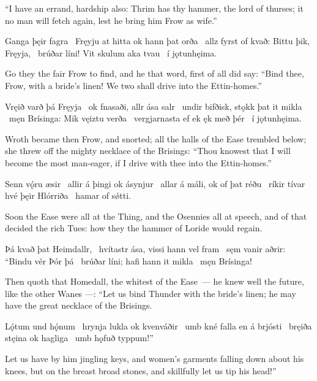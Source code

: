  “I have an errand, hardship also: Thrim has thy hammer, the lord of thurses; it no man will fetch again, lest he bring him Frow as wife.”\evb
\evg


\bvg
\bva Ganga þęir fagra \hld\ Fręyju at hitta
ok hann þat orða \hld\ allz fyrst of kvað:
Bittu þik, Fręyja, \hld\ brúðar líni!
Vit skulum aka tvau \hld\ í jǫtunhęima.\eva

\bvb Go they the fair Frow to find, and he that word, first of all did say: “Bind thee, Frow, with a bride’s linen! We two shall drive into the Ettin-homes.”\evb

Vręið varð þá Fręyja \hld\ ok fnasaði,
allr ása salr \hld\ undir bifðisk,
stǫkk þat it mikla \hld\ męn Brísinga:
Mik vęiztu verða \hld\ vergjarnasta
ef ek ęk með þér \hld\ í jǫtunhęima.

Wroth became then Frow, and snorted; all the halls of the Ease trembled below; she threw off the mighty necklace of the Brisings: “Thou knowest that I will become the most man-eager, if I drive with thee into the Ettin-homes.”

Senn vǫ́ru æsir \hld\ allir á þingi
ok ásynjur \hld\ allar á máli,
ok of þat réðu \hld\ ríkir tívar
hvé þęir Hlórriða \hld\ hamar of sǿtti.

Soon the Ease were all at the Thing, and the Osennies all at speech, and of that decided the rich Tues: how they the hammer of Loride would regain\footnotemark[1].

Þá kvað þat Heimdallr, \hld\ hvítastr ása,
vissi hann vel fram \hld\ sęm vanir aðrir:
“Bindu vér Þór þá \hld\ brúðar líni;
hafi hann it mikla \hld\ męn Brísinga!

Then quoth that Homedall, the whitest of the Ease — he knew well the future, like the other Wanes —: “Let us bind Thunder with the bride’s linen; he may have the great necklace of the Brisings.

Lǫ́tum und hǫ́num \hld\ hrynja lukla
ok kvenváðir \hld\ umb kné falla
en á brjósti \hld\ bręiða stęina
ok hagliga \hld\ umb hǫfuð typpum!”

Let us have by him jingling keys\footnotemark[1], and women’s garments falling down about his knees, but on the breast broad stones\footnotemark[2], and skillfully let us tip his head!\footnotemark[3]”

